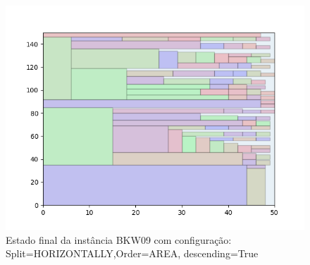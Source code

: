 \begin{figure}[H]
    \centering
    \caption[]{Estado final da instância BKW09 com configuração: Split=HORIZONTALLY,Order=AREA, descending=True}
    \label{fig:bkw09-horizontally-area-true}
    \includegraphics[scale=0.5]{output/figures/bkw/bkw09/horizontally/area/true/000}
\end{figure}